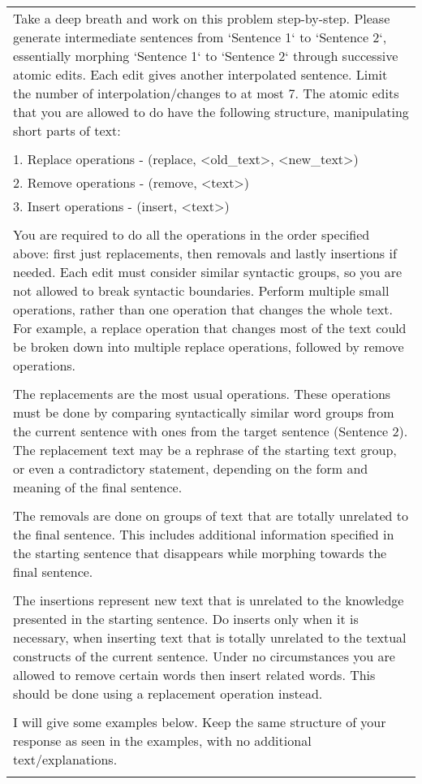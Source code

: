 \begin{tabular}{p{16cm}}
\hline
Take a deep breath and work on this problem step-by-step. Please generate intermediate sentences from `Sentence 1` to `Sentence 2`, essentially morphing `Sentence 1` to `Sentence 2` through successive atomic edits. Each edit gives another interpolated sentence. Limit the number of interpolation/changes to at most 7. The atomic edits that you are allowed to do have the following structure, manipulating short parts of text:\\ \\
        1. Replace operations - (replace, <old\_text>, <new\_text>)\\
	2. Remove operations - (remove, <text>)\\
        3. Insert operations - (insert, <text>) \\\\
            
You are required to do all the operations in the order specified above: first just replacements, then removals and lastly insertions if needed. Each edit must consider similar syntactic groups, so you are not allowed to break syntactic boundaries. Perform multiple small operations, rather than one operation that changes the whole text. For example, a replace operation that changes most of the text could be broken down into multiple replace operations, followed by remove operations.\\
\\
The replacements are the most usual operations. These operations must be done by comparing syntactically similar word groups from the current sentence with ones from the target sentence (Sentence 2). The replacement text may be a rephrase of the starting text group, or even a contradictory statement, depending on the form and meaning of the final sentence. \\ \\
The removals are done on groups of text that are totally unrelated to the final sentence. This includes additional information specified in the starting sentence that disappears while morphing towards the final sentence.\\ \\
The insertions represent new text that is unrelated to the knowledge presented in the starting sentence. Do inserts only when it is necessary, when inserting text that is totally unrelated to the textual constructs of the current sentence. Under no circumstances you are allowed to remove certain words then insert related words. This should be done using a replacement operation instead.\\ \\
I will give some examples below. Keep the same structure of your response as seen in the examples, with no additional text/explanations.\\ \\


\end{tabular}
